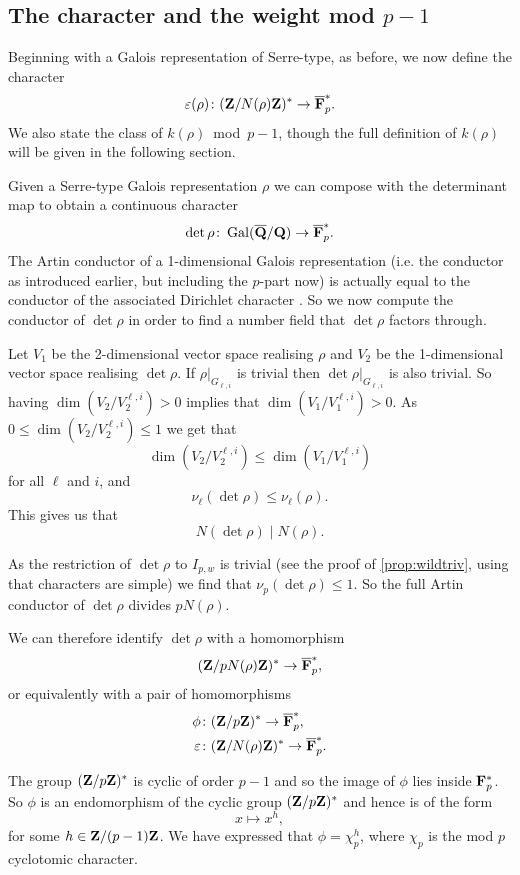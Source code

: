 \documentclass[a4paper,12pt]{article}
\begin{document}
\subsection{The character and the weight mod $p-1$}\label{subsec:char}
Beginning with a Galois representation of Serre-type, as before, we now define the character
\[
\varepsilon(\rho)\colon  (\mathbf{Z}/N(\rho)\mathbf{Z})^* \to \overline{\mathbf{F}}_p^*.
\]
We also state the class of $k(\rho)$~mod~$p-1$, though the full definition of $k(\rho)$ will be given in the following section.

Given a Serre-type Galois representation $\rho$ we can compose with the determinant map to obtain a continuous character
\[
\det \rho\colon \operatorname{Gal}(\overline{\mathbf{Q}}/\mathbf{Q}) \to \overline{\mathbf{F}}_p^*.
\]
The Artin conductor of a 1-dimensional Galois representation (i.e. the conductor as introduced earlier, but including the $p$-part now) is actually equal to the conductor of the associated Dirichlet character \cite[p. 228]{SerreLF}.
So we now compute the conductor of $\det\rho$ in order to find a number field that $\det\rho$ factors through.

Let $V_1$ be the 2-dimensional vector space realising $\rho$ and $V_2$ be the 1-dimensional vector space realising $\det\rho$.
If $\rho|_{G_{\ell,i}}$ is trivial then $\det\rho|_{G_{\ell, i}}$ is also trivial.
So having $\dim(V_2/V_2^{\ell,i}) > 0$ implies that $\dim(V_1/V_1^{\ell,i}) > 0$.
As $0 \le \dim(V_2/V_2^{\ell,i}) \le 1$ we get that
\[
\dim(V_2/V_2^{\ell,i})\le \dim(V_1/V_1^{\ell,i})
\]
for all $\ell$ and $i$, and %
\[
\nu_\ell(\det\rho) \le \nu_\ell(\rho).
\]
This gives us that
\[
N(\det\rho) \mid N(\rho).
\]

As the restriction of $\det\rho$ to $I_{p,w}$ is trivial (see the proof of \cref{prop:wildtriv}, using that characters are simple) we find that $\nu_p(\det\rho)\le 1$.
So the full Artin conductor of $\det\rho$ divides $pN(\rho)$.

We can therefore identify $\det\rho$ with a homomorphism
\[
(\mathbf{Z}/pN(\rho)\mathbf{Z})^* \to \overline{\mathbf{F}}_p^*,
\]
or equivalently with a pair of homomorphisms
\begin{align*}
\phi\colon& (\mathbf{Z}/p\mathbf{Z})^* \to \overline{\mathbf{F}}_p^*,\\
\varepsilon\colon& (\mathbf{Z}/N(\rho)\mathbf{Z})^* \to \overline{\mathbf{F}}_p^*.
\end{align*}

The group $(\mathbf{Z}/p\mathbf{Z})^*$ is cyclic of order $p-1$ and so the image of $\phi$ lies inside $\mathbf{F}_p^*$.
So $\phi$ is an endomorphism of the cyclic group $(\mathbf{Z}/p\mathbf{Z})^*$ and hence is of the form
\[
x \mapsto x^h,
\]
for some $h \in \mathbf{Z}/(p-1)\mathbf{Z}$.
We have expressed that $\phi = \chi_p^h$, where $\chi_p$ is the mod $p$ cyclotomic character.
\end{document}

